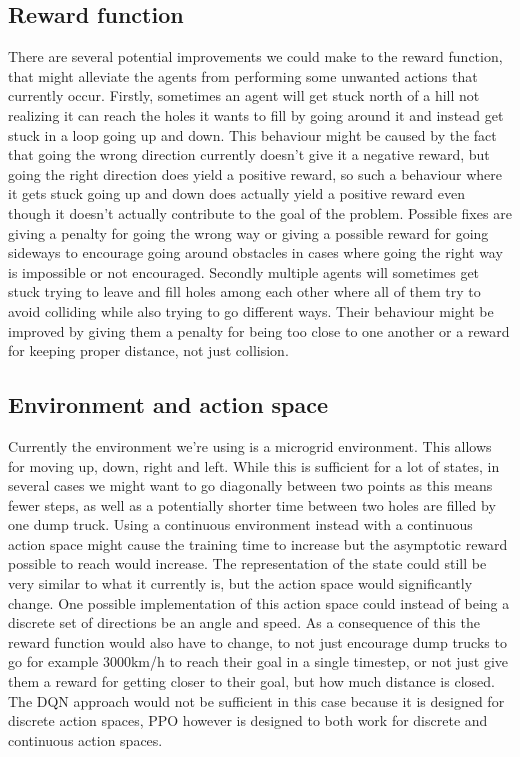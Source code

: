 \documentclass[conference]{IEEEtran}
\begin{document}
\subsection{Reward function}
There are several potential improvements we could make to the reward function, that might alleviate the agents from performing some unwanted actions that currently occur.
Firstly, sometimes an agent will get stuck north of a hill not realizing it can reach the holes it wants to fill by going around it and instead get stuck in a loop going up and down.
This behaviour might be caused by the fact that going the wrong direction currently doesn't give it a negative reward, but going the right direction does yield a positive reward, so such a behaviour where it gets stuck going up and down does actually yield a positive reward even though it doesn't actually contribute to the goal of the problem.
Possible fixes are giving a penalty for going the wrong way or giving a possible reward for going sideways to encourage going around obstacles in cases where going the right way is impossible or not encouraged.
Secondly multiple agents will sometimes get stuck trying to leave and fill holes among each other where all of them try to avoid colliding while also trying to go different ways.
Their behaviour might be improved by giving them a penalty for being too close to one another or a reward for keeping proper distance, not just collision.

\subsection{Environment and action space}
Currently the environment we're using is a microgrid environment. This allows for moving up, down, right and left.
While this is sufficient for a lot of states, in several cases we might want to go diagonally between two points as this means fewer steps, as well as a potentially shorter time between two holes are filled by one dump truck.
Using a continuous environment instead with a continuous action space might cause the training time to increase but the asymptotic reward possible to reach would increase. The representation of the state could still be very similar to what it currently is, but the action space would significantly change.
One possible implementation of this action space could instead of being a discrete set of directions be an angle and speed.
As a consequence of this the reward function would also have to change, to not just encourage dump trucks to go for example 3000km/h to reach their goal in a single timestep, or not just give them a reward for getting closer to their goal, but how much distance is closed.
The DQN approach would not be sufficient in this case because it is designed for discrete action spaces, PPO however is designed to both work for discrete and continuous action spaces.
\end{document}
